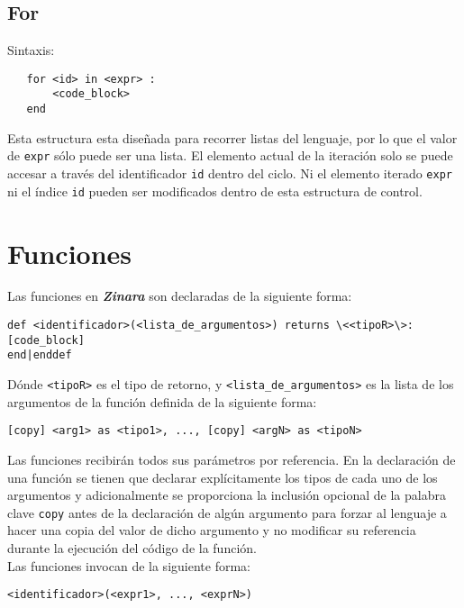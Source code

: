 \documentclass[12pt, spanish]{report}
\begin{document}
\section{For}
Sintaxis:
\begin{verbatim}
   for <id> in <expr> :
       <code_block>
   end
\end{verbatim}

Esta estructura esta dise\~nada para recorrer listas del lenguaje,
por lo que el valor de \texttt{expr} s\'olo puede ser una lista.
El elemento actual de la iteraci\'on solo se puede accesar a trav\'es
del identificador \texttt{id} dentro del ciclo. Ni el elemento iterado
\texttt{expr} ni el \'indice \texttt{id} pueden ser modificados dentro
de esta estructura de control.\\


\chapter{Funciones}
\label{sec:func}

Las funciones en \emph{\textbf{Zinara}} son declaradas de la siguiente
forma:

\begin{verbatim}
def <identificador>(<lista_de_argumentos>) returns \<<tipoR>\>:
[code_block]
end|enddef
\end{verbatim}

D\'onde \texttt{<tipoR>} es el tipo de retorno, y
\texttt{<lista\_de\_argumentos>} es la lista de los argumentos de la
funci\'on definida de la siguiente forma:

\begin{verbatim}
[copy] <arg1> as <tipo1>, ..., [copy] <argN> as <tipoN>
\end{verbatim}

Las funciones recibir\'an todos sus par\'ametros por referencia. En la
declaraci\'on de una funci\'on se tienen que declarar expl\'icitamente los
tipos de cada uno de los argumentos y adicionalmente se proporciona la
inclusi\'on opcional de la palabra clave \texttt{copy} antes de la
declaraci\'on de alg\'un argumento para forzar al lenguaje a hacer una
copia del valor de dicho argumento y no modificar su referencia
durante la ejecuci\'on del c\'odigo de la funci\'on.\\

Las funciones invocan de la siguiente forma:

\begin{verbatim}
<identificador>(<expr1>, ..., <exprN>)
\end{verbatim}
\end{document}
